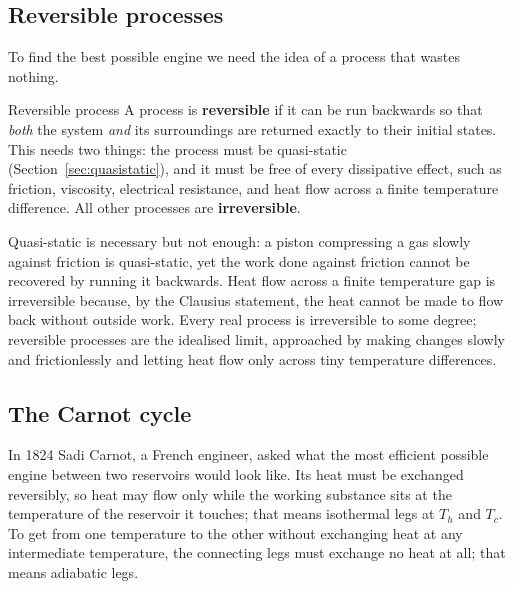 \subsection{Reversible processes}\label{sec:reversible}

To find the best possible engine we need the idea of a process that wastes nothing.

\begin{defbox}{Reversible process}
A process is \textbf{reversible} if it can be run backwards so that \emph{both} the system \emph{and} its
surroundings are returned exactly to their initial states. This needs two things: the process must be
quasi-static (Section~\ref{sec:quasistatic}), and it must be free of every dissipative effect, such as
friction, viscosity, electrical resistance, and heat flow across a finite temperature difference. All
other processes are \textbf{irreversible}.
\end{defbox}

Quasi-static is necessary but not enough: a piston compressing a gas slowly against friction is
quasi-static, yet the work done against friction cannot be recovered by running it backwards. Heat flow
across a finite temperature gap is irreversible because, by the Clausius statement, the heat cannot be
made to flow back without outside work. Every real process is irreversible to some degree; reversible
processes are the idealised limit, approached by making changes slowly and frictionlessly and letting
heat flow only across tiny temperature differences.

\subsection{The Carnot cycle}\label{sec:carnot}

In 1824 Sadi Carnot, a French engineer, asked what the most efficient possible engine between two
reservoirs would look like. Its heat must be exchanged reversibly, so heat may flow only while the
working substance sits at the temperature of the reservoir it touches; that means isothermal legs at
$T_h$ and $T_c$. To get from one temperature to the other without exchanging heat at any intermediate
temperature, the connecting legs must exchange no heat at all; that means adiabatic legs.

\begin{figure}[htbp]
\centering
{}
\end{figure}

